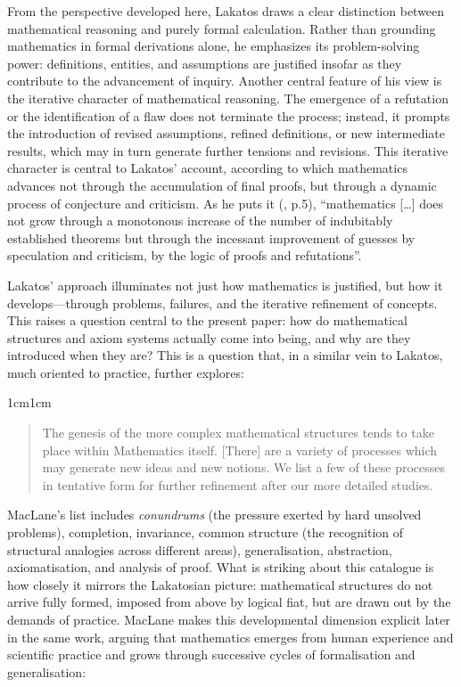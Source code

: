 \documentclass[11pt,a4paper]{book}
\theoremstyle{plain}
\begin{document}
From the perspective developed here, Lakatos draws a clear distinction between mathematical reasoning and purely formal calculation. Rather than grounding mathematics in formal derivations alone, he emphasizes its problem-solving power: definitions, entities, and assumptions are justified insofar as they contribute to the advancement of inquiry. Another central feature of his view is the iterative character of mathematical reasoning. The emergence of a refutation or the identification of a flaw does not terminate the process; instead, it prompts the introduction of revised assumptions, refined definitions, or new intermediate results, which may in turn generate further tensions and revisions. This iterative character is central to Lakatos’ account, according to which mathematics advances not through the accumulation of final proofs, but through a dynamic process of conjecture and criticism. As he puts it (\citeyear{Lakatos1976}, p.5), “mathematics [\dots] does not grow through a monotonous increase of the number of indubitably established theorems but through the incessant improvement of guesses by speculation and criticism, by the logic of proofs and refutations”.

Lakatos' approach illuminates not just how mathematics is justified, but how it develops---through problems, failures, and the iterative refinement of concepts. This raises a question central to the present paper: how do mathematical structures and axiom systems actually come into being, and why are they introduced when they are? This is a question that, in a similar vein to Lakatos, much oriented to practice, \textcite[36]{maclane1986mathematics} further explores:

\begin{adjustwidth}{1cm}{1cm}
\small
\begin{quote}
The genesis of the more complex mathematical structures tends to take place within Mathematics itself. [There] are a variety of processes which may generate new ideas and new notions. We list a few of these processes in tentative form for further refinement after our more detailed studies. \parencite[p. 36]{maclane1986mathematics}
\end{quote}
\end{adjustwidth}

MacLane's list includes \textit{conundrums} (the pressure exerted by hard unsolved problems), completion, invariance, common structure (the recognition of structural analogies across different areas), generalisation, abstraction, axiomatisation, and analysis of proof. What is striking about this catalogue is how closely it mirrors the Lakatosian picture: mathematical structures do not arrive fully formed, imposed from above by logical fiat, but are drawn out by the demands of practice. MacLane makes this developmental dimension explicit later in the same work, arguing that mathematics emerges from human experience and scientific practice and grows through successive cycles of formalisation and generalisation:
\end{document}
